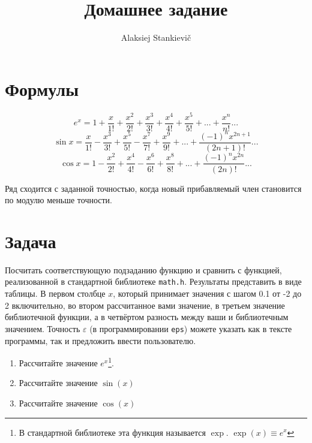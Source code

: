 \documentclass[12pt]{article}
\author{Alaksiej Stankievič}
\title{Домашнее задание}
\begin{document}


\section{Формулы}
\begin{equation}
 e^x = 1 + \frac{x}{1!}+\frac{x^2}{2!}+\frac{x^3}{3!}+\frac{x^4}{4!}+\frac{x^5}{5!}+...+\frac{x^n}{n!}...
\end{equation}
\begin{equation}
 \sin{x} = \frac{x}{1!}-\frac{x^3}{3!}+\frac{x^5}{5!}-\frac{x^7}{7!}+\frac{x^9}{9!}+...+\frac{(-1)^{n}x^{2n+1}}{(2n+1)!}...
\end{equation}
\begin{equation}
 \cos{x} = 1 - \frac{x^2}{2!}+\frac{x^4}{4!}-\frac{x^6}{6!}+\frac{x^8}{8!}+...+\frac{(-1)^{n}x^{2n}}{(2n)!}...
\end{equation}

Ряд сходится с заданной точностью, когда новый прибавляемый член становится по модулю меньше точности.

\section{Задача}
Посчитать соответствующую подзаданию функцию и сравнить с функцией, реализованной в стандартной библиотеке \verb|math.h|. Результаты представить в виде таблицы. В первом столбце $x$, который принимает значения с шагом 0.1 от -2 до 2 включительно, во втором рассчитанное вами значение, в третьем значение библиотечной функции, а в четвёртом разность между ваши и библиотечным значением. Точность $\varepsilon$ (в программировании \verb|eps|) можете указать как в тексте программы, так и предложить ввести пользователю.

\begin{enumerate}
 \item Рассчитайте значение $e^x$\footnote{В стандартной библиотеке эта функция называется $\exp$. $\exp(x) \equiv e^x$}.
 \item Рассчитайте значение $\sin(x)$
 \item Рассчитайте значение $\cos(x)$
\end{enumerate}
\end{document}
